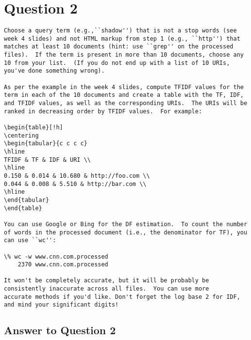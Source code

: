 \documentclass{article}
\begin{document}
\section*{Question 2}
\begin{verbatim}
Choose a query term (e.g.,``shadow'') that is not a stop words (see week 4 slides) and not HTML markup from step 1 (e.g., ``http'') that matches at least 10 documents (hint: use ``grep'' on the processed files).  If the term is present in more than 10 documents, choose any 10 from your list.  (If you do not end up with a list of 10 URIs, you've done something wrong).

As per the example in the week 4 slides, compute TFIDF values for the term in each of the 10 documents and create a table with the TF, IDF, and TFIDF values, as well as the corresponding URIs.  The URIs will be ranked in decreasing order by TFIDF values.  For example:

\begin{table}[!h]
\centering
\begin{tabular}{c c c c}
\hline
TFIDF & TF & IDF & URI \\
\hline
0.150 & 0.014 & 10.680 & http://foo.com \\
0.044 & 0.008 & 5.510 & http://bar.com \\
\hline
\end{tabular}
\end{table}

You can use Google or Bing for the DF estimation.  To count the number of words in the processed document (i.e., the denominator for TF), you can use ``wc'':

\% wc -w www.cnn.com.processed
    2370 www.cnn.com.processed

It won't be completely accurate, but it will be probably be consistently inaccurate across all files.  You can use more 
accurate methods if you'd like. Don't forget the log base 2 for IDF, and mind your significant digits!
\end{verbatim}

\subsection*{Answer to Question 2}
\end{document}
